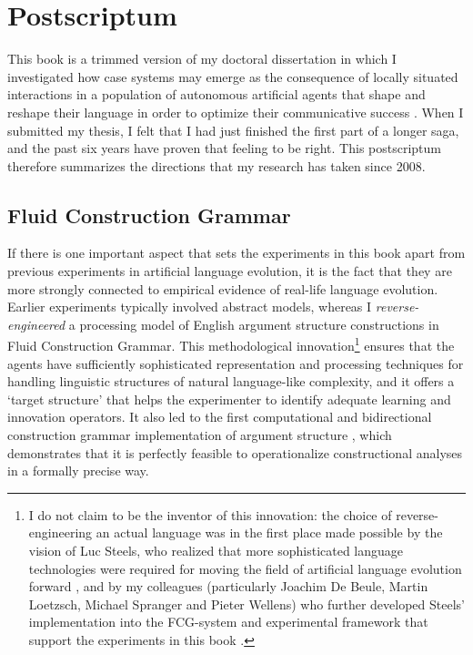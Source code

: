\chapter{Postscriptum}
\label{c:conclusion}

This book is a trimmed version of my doctoral dissertation in which I investigated how case systems may emerge as the consequence of locally situated interactions in a population of autonomous artificial agents that shape and reshape their language in order to optimize their communicative success \citep{vantrijp08analogy}. When I submitted my thesis, I felt that I had just finished the first part of a longer saga, and the past six years have proven that feeling to be right. This postscriptum therefore summarizes the directions that my research has taken since 2008.

\section*{Fluid Construction Grammar}

If there is one important aspect that sets the experiments in this book apart from previous experiments in artificial language evolution, it is the fact that they are more strongly connected to empirical evidence of real-life language evolution. Earlier experiments typically involved abstract models, whereas I {\em reverse-engineered} a processing model of English argument structure constructions in Fluid Construction Grammar. This methodological innovation\footnote{I do not claim to be the inventor of this innovation: the choice of reverse-engineering an actual language was in the first place made possible by the vision of Luc Steels, who realized that more sophisticated language technologies were required for moving the field of artificial language evolution forward \citep{steels04constructivist}, and by my colleagues (particularly Joachim De Beule, Martin Loetzsch, Michael Spranger and Pieter Wellens) who further developed Steels' implementation into the FCG-system and experimental framework that support the experiments in this book \citep{loetzsch:08b}.} ensures that the agents have sufficiently sophisticated representation and processing techniques for handling linguistic structures of natural language-like complexity, and it offers a `target structure' that helps the experimenter to identify adequate learning and innovation operators. It also led to the first computational and bidirectional construction grammar implementation of argument structure \citep{vantrijp08argumentsstruktur}, which demonstrates that it is perfectly feasible to operationalize constructional analyses in a formally precise way.

